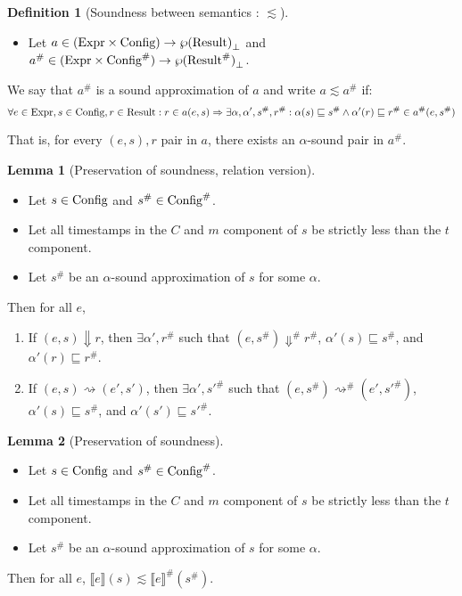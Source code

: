 \documentclass[acmsmall,screen,review]{acmart}
\theoremstyle{definition}
\newtheorem{definition}{Definition}[section]
\newtheorem{lem}{Lemma}[section]
\newcommand*{\A}[1]{{#1}^{\#}}
\newcommand*{\Expr}{\text{Expr}}
\newcommand*{\Time}{\mathbb{T}}
\newcommand*{\ATime}{\A{\Time}}
\newcommand*{\mem}{m}
\newcommand*{\Config}[1]{\text{Config}\vphantom{#1}}
\newcommand*{\AConfig}[1]{\A{\text{Config}}\vphantom{#1}}
\newcommand*{\Result}[1]{\text{Result}\vphantom{#1}}
\newcommand*{\AResult}[1]{\A{\text{Result}}\vphantom{#1}}
\newcommand*{\sembracket}[1]{\lBrack{#1}\rBrack}
\begin{document}
\begin{definition}[Soundness between semantics : $\lesssim$]
  $\:$

  \begin{itemize}
    \item Let $a\in(\Expr\times\Config{\Time})\rightarrow{\wp(\Result{\Time})}_{\bot}$ and $\A{a}\in(\Expr\times\AConfig{\ATime})\rightarrow{\wp(\AResult{\ATime})}_{\bot}$.
  \end{itemize}

  We say that $\A{a}$ is a sound approximation of $a$ and write $a\lesssim\A{a}$ if:
  \[
    \forall e\in\Expr,s\in\Config{\Time},r\in\Result{\Time}:r\in a(e,s)\Rightarrow\exists\alpha,\alpha',\A{s},\A{r}:\alpha(s)\sqsubseteq\A{s}\wedge\alpha'(r)\sqsubseteq\A{r}\in\A{a}(e,\A{s})
  \]

  That is, for every $(e,s), r$ pair in $a$, there exists an $\alpha$-sound pair in $\A{a}$.
\end{definition}

\begin{lem}[Preservation of soundness, relation version]
  $\:$

  \begin{itemize}
    \item Let $s\in\Config{\Time}$ and $\A{s}\in\AConfig{\ATime}$.
    \item Let all timestamps in the $C$ and $\mem$ component of $s$ be strictly less than the $t$ component.
    \item Let $\A{s}$ be an $\alpha$-sound approximation of $s$ for some $\alpha$.
  \end{itemize}

  Then for all $e$,
  \begin{enumerate}
    \item If $(e,s)\Downarrow r$, then $\exists\alpha',\A{r}$ such that $(e,\A{s})\A\Downarrow\A{r}$, $\alpha'(s)\sqsubseteq\A{s}$, and $\alpha'(r)\sqsubseteq\A{r}$.
    \item If $(e,s)\rightsquigarrow (e',s')$, then $\exists\alpha', \A{s'}$ such that $(e,\A{s})\A\rightsquigarrow(e',\A{s'})$, $\alpha'(s)\sqsubseteq\A{s}$, and $\alpha'(s')\sqsubseteq\A{s'}$.
  \end{enumerate}
\end{lem}

\begin{lem}[Preservation of soundness]
  $\:$

  \begin{itemize}
    \item Let $s\in\Config{\Time}$ and $\A{s}\in\AConfig{\ATime}$.
    \item Let all timestamps in the $C$ and $\mem$ component of $s$ be strictly less than the $t$ component.
    \item Let $\A{s}$ be an $\alpha$-sound approximation of $s$ for some $\alpha$.
  \end{itemize}

  Then for all $e$, $\sembracket{e}(s)\lesssim\A{\sembracket{e}}(\A{s})$.
\end{lem}
\end{document}
